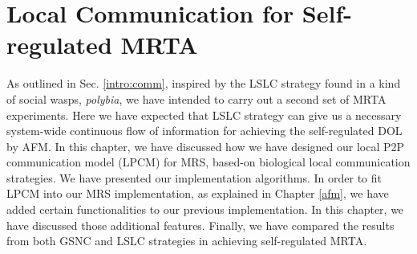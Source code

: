 \chapter{Local Communication for Self-regulated MRTA}
\label{local-comm}
As outlined in Sec. \ref{intro:comm}, inspired by the LSLC strategy found in a kind of social wasps, {\em polybia}, we have intended to carry out a second set of MRTA experiments.  Here we have expected that LSLC strategy can give us a necessary system-wide continuous flow of information for achieving the self-regulated DOL by AFM. In this chapter, we have discussed how we have designed our local P2P communication  model (LPCM) for MRS, based-on biological local communication strategies. We have presented our implementation algorithms.  In order to fit LPCM into our MRS implementation, as explained in Chapter \ref{afm}, we have added  certain functionalities to our previous implementation. In this chapter, we have discussed those additional features. Finally, we have compared the results from both GSNC and LSLC strategies in achieving self-regulated MRTA. 
